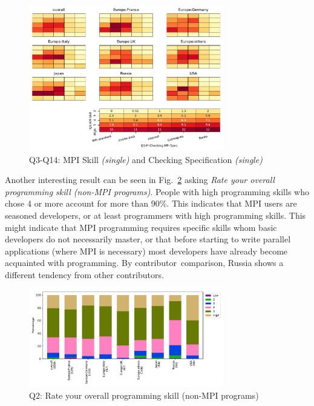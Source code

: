 \documentclass[preprint,5p,times]{elsarticle}
\def\myquote#1{{\it #1}}
\def\country{contributor}%
\def\countries{contributors}%
\begin{document}
\begin{figure}[htb]
\begin{center}
\includegraphics[width=8.5cm]{Figs/Q3-Q14.pdf}
\caption{Q3-Q14: MPI Skill {\it(single)} and Checking Specification {\it(single)}}
\label{fig:reading-standard-and-checking-spec}
\end{center}
\end{figure}

Another interesting result can be seen in Fig.~\ref{fig:prog-skill} asking
\myquote{Rate your overall programming skill (non-MPI programs)}. People with
high programming skills who chose 4 or more account for more than 90\%. This
indicates that MPI users are seasoned developers, or at least programmers with
high programming skills. This might indicate that MPI programming requires
specific skills whom basic developers do not necessarily master, or that before
starting to write parallel applications (where MPI is necessary) most developers
have already become acquainted with programming. By \country\ comparison, Russia
shows a different tendency from other \countries.

\begin{figure}[htb]
\begin{center}
\includegraphics[width=8.5cm]{Figs/Q2.pdf}
\caption{Q2: Rate your overall programming skill (non-MPI
  programs)}
\label{fig:prog-skill}
\end{center}
\end{figure}
\end{document}
